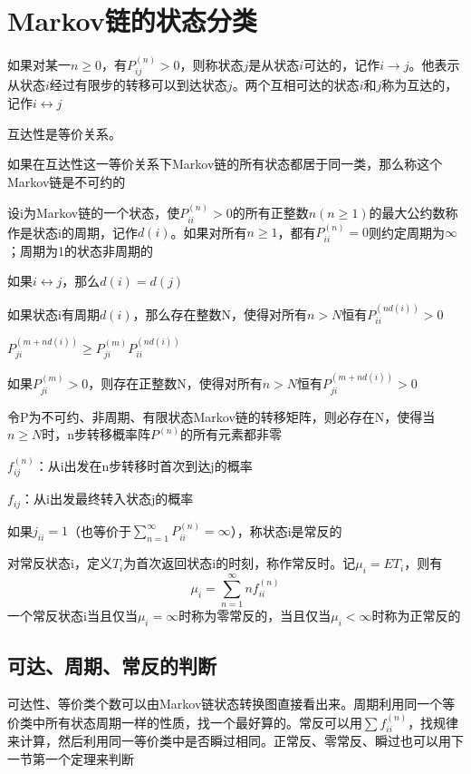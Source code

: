 \documentclass[]{report}
\begin{document}
	\section{Markov链的状态分类}
		\begin{definition}[可达与互达]
			如果对某一$n\ge0$，有$P_{ij}^(n)>0$，则称状态$j$是从状态$i$可达的，记作$i\to j$。他表示从状态$i$经过有限步的转移可以到达状态$j$。两个互相可达的状态$i$和$j$称为互达的，记作$i\leftrightarrow j$
		\end{definition}
		互达性是等价关系。\par
		如果在互达性这一等价关系下Markov链的所有状态都居于同一类，那么称这个Markov链是不可约的
		\begin{definition}[Markov链的周期]
			设i为Markov链的一个状态，使$P_{ii}^{(n)}>0$的所有正整数$n(n\ge1)$的最大公约数称作是状态i的周期，记作$d(i)$。如果对所有$n\ge1$，都有$P_{ii}^{(n)}=0$则约定周期为$\infty$；周期为1的状态非周期的
		\end{definition}
		如果$i\leftrightarrow j$，那么$d(i)=d(j)$
		\begin{theorem}
			如果状态i有周期$d(i)$，那么存在整数N，使得对所有$n>N$恒有$P_{ii}^{(nd(i))}>0$\par
			$P_{ji}^{(m+nd(i))}\ge P_{ji}^{(m)}P_{ii}^{(nd(i))}$\par
			如果$P_{ji}^{(m)}>0$，则存在正整数N，使得对所有$n>N$恒有$P_{ji}^{(m+nd(i))}>0$
		\end{theorem}
		\begin{theorem}
			令P为不可约、非周期、有限状态Markov链的转移矩阵，则必存在N，使得当$n\ge N$时，n步转移概率阵$P^{(n)}$的所有元素都非零
		\end{theorem}
		\begin{definition}[常反和瞬过]
			$f_{ij}^{(n)}$：从i出发在n步转移时首次到达j的概率\par
			$f_{ij}$：从i出发最终转入状态j的概率\par
			如果$j_{ii}=1$（也等价于$\displaystyle\sum_{n=1}^\infty P_{ii}^{(n)}=\infty$），称状态i是常反的
		\end{definition}
		\begin{definition}
			对常反状态i，定义$T_i$为首次返回状态i的时刻，称作常反时。记$\mu_i=ET_i$，则有
			\[\mu_i=\sum_{n=1}^\infty nf_{ii}^{(n)}\]
			一个常反状态i当且仅当$\mu_i=\infty$时称为零常反的，当且仅当$\mu_i<\infty$时称为正常反的
		\end{definition}
		\subsection{可达、周期、常反的判断}
			可达性、等价类个数可以由Markov链状态转换图直接看出来。周期利用同一个等价类中所有状态周期一样的性质，找一个最好算的。常反可以用$\sum f_{ii}^{(n)}$，找规律来计算，然后利用同一等价类中是否瞬过相同。正常反、零常反、瞬过也可以用下一节第一个定理来判断
\end{document}
